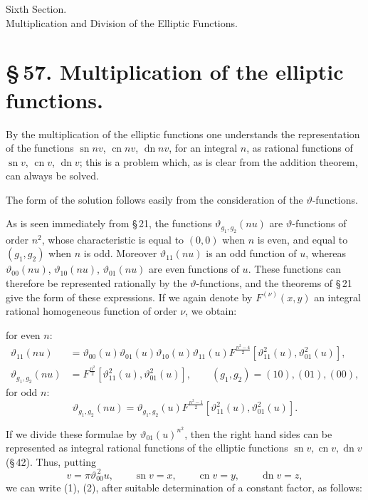 \documentclass[11pt]{article}
\providecommand{\sn}{\operatorname{sn}}
\providecommand{\cn}{\operatorname{cn}}
\providecommand{\dn}{\operatorname{dn}}
\begin{document}
\begin{center}
{\large Sixth Section.}\\[0.7em]
{\Large Multiplication and Division of the Elliptic Functions.}
\end{center}

\section*{\S\,57. Multiplication of the elliptic functions.}

By the multiplication of the elliptic functions one understands the representation of the
functions $\sn n v$, $\cn n v$, $\dn n v$, for an integral $n$, as rational functions of
$\sn v$, $\cn v$, $\dn v$; this is a problem which, as is clear from the addition theorem,
can always be solved.

The form of the solution follows easily from the consideration of the $\vartheta$-functions.

As is seen immediately from \S\,21, the functions $\vartheta_{g_1,g_2}(n u)$ are
$\vartheta$-functions of order $n^2$, whose characteristic is equal to $(0,0)$ when $n$ is
even, and equal to $(g_1,g_2)$ when $n$ is odd. Moreover $\vartheta_{11}(nu)$ is an odd
function of $u$, whereas $\vartheta_{00}(nu)$, $\vartheta_{10}(nu)$, $\vartheta_{01}(nu)$ are
even functions of $u$. These functions can therefore be represented rationally by the
$\vartheta$-functions, and the theorems of \S\,21 give the form of these expressions. If we
again denote by $F^{(\nu)}(x,y)$ an integral rational homogeneous function of order $\nu$,
we obtain:

for even $n$:
\begin{equation}
\begin{aligned}
\vartheta_{11}(nu)
&=\vartheta_{00}(u)\vartheta_{01}(u)\vartheta_{10}(u)\vartheta_{11}(u)
 F^{\frac{n^2-4}{2}}\!\left[\vartheta_{11}^2(u),\vartheta_{01}^2(u)\right],\\
\vartheta_{g_1,g_2}(nu)
&=F^{\frac{n^2}{2}}\!\left[\vartheta_{11}^2(u),\vartheta_{01}^2(u)\right],
\qquad (g_1,g_2)=(10),(01),(00),
\end{aligned}
\tag{1}
\end{equation}
for odd $n$:
\begin{equation}
\vartheta_{g_1,g_2}(nu)
=\vartheta_{g_1,g_2}(u)F^{\frac{n^2-1}{2}}\!\left[\vartheta_{11}^2(u),\vartheta_{01}^2(u)\right].
\tag{2}
\end{equation}

If we divide these formulae by $\vartheta_{01}(u)^{n^2}$, then the right hand sides can
be represented as integral rational functions of the elliptic functions
$\sn v,\cn v,\dn v$ (\S\,42). Thus, putting
\begin{equation}
v=\pi\vartheta_{00}^{\,2}u,\qquad \sn v=x,\qquad \cn v=y,\qquad \dn v=z,
\tag{3}
\end{equation}
we can write (1), (2), after suitable determination of a constant factor, as follows:
\end{document}
